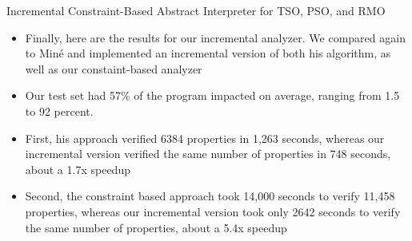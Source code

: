\documentclass[t]{beamer}
\begin{document}
\begin{frame}{Incremental Constraint-Based Abstract Interpreter for TSO, PSO, and RMO}
{\begin{itemize}
      \item Finally, here are the results for our incremental analyzer. We
        compared again to Min\'{e} and implemented an incremental version of
        both his algorithm, as well as our constaint-based analyzer
      \item Our test set had 57\% of the program impacted on average, ranging
        from 1.5 to 92 percent.
      \item First, his approach verified 6384 properties in 1,263 seconds,
        whereas our incremental version verified the same number of properties
        in 748 seconds, about a 1.7x speedup
      \item Second, the constraint based approach took 14,000 seconds to verify
        11,458 properties, whereas our incremental version took only 2642
        seconds to verify the same number of properties, about a 5.4x speedup
    \end{itemize}
  }
\end{frame}
\end{document}
